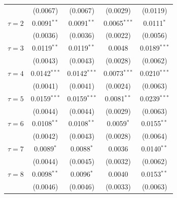\begin{tabular}{lcccc}
                                                & (0.0067)        & (0.0067)               & (0.0029)                    & (0.0119)\\   
   $\tau = 2$                                   & 0.0091$^{**}$   & 0.0091$^{**}$          & 0.0065$^{***}$              & 0.0111$^{*}$\\   
                                                & (0.0036)        & (0.0036)               & (0.0022)                    & (0.0056)\\   
   $\tau = 3$                                   & 0.0119$^{**}$   & 0.0119$^{**}$          & 0.0048                      & 0.0189$^{***}$\\   
                                                & (0.0043)        & (0.0043)               & (0.0028)                    & (0.0062)\\   
   $\tau = 4$                                   & 0.0142$^{***}$  & 0.0142$^{***}$         & 0.0073$^{***}$              & 0.0210$^{***}$\\   
                                                & (0.0041)        & (0.0041)               & (0.0024)                    & (0.0063)\\   
   $\tau = 5$                                   & 0.0159$^{***}$  & 0.0159$^{***}$         & 0.0081$^{**}$               & 0.0239$^{***}$\\   
                                                & (0.0044)        & (0.0044)               & (0.0029)                    & (0.0063)\\   
   $\tau = 6$                                   & 0.0108$^{**}$   & 0.0108$^{**}$          & 0.0059$^{*}$                & 0.0155$^{**}$\\   
                                                & (0.0042)        & (0.0043)               & (0.0028)                    & (0.0064)\\   
   $\tau = 7$                                   & 0.0089$^{*}$    & 0.0088$^{*}$           & 0.0036                      & 0.0140$^{**}$\\   
                                                & (0.0044)        & (0.0045)               & (0.0032)                    & (0.0062)\\   
   $\tau = 8$                                   & 0.0098$^{**}$   & 0.0096$^{*}$           & 0.0040                      & 0.0153$^{**}$\\   
                                                & (0.0046)        & (0.0046)               & (0.0033)                    & (0.0063)\\   

\end{tabular}
